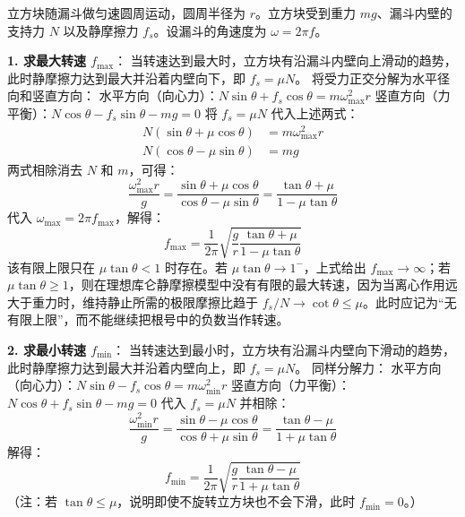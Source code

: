 \begin{solution}
立方块随漏斗做匀速圆周运动，圆周半径为 $r$。立方块受到重力 $mg$、漏斗内壁的支持力 $N$ 以及静摩擦力 $f_s$。设漏斗的角速度为 $\omega = 2\pi f$。

\textbf{1. 求最大转速 $f_{\max}$}：
当转速达到最大时，立方块有沿漏斗内壁向上滑动的趋势，此时静摩擦力达到最大并沿着内壁向下，即 $f_s = \mu N$。
将受力正交分解为水平径向和竖直方向：
水平方向（向心力）：$ N \sin\theta + f_s \cos\theta = m \omega_{\max}^2 r $
竖直方向（力平衡）：$ N \cos\theta - f_s \sin\theta - mg = 0 $
将 $f_s = \mu N$ 代入上述两式：
\begin{align*}
    N(\sin\theta + \mu \cos\theta) &= m \omega_{\max}^2 r \\
    N(\cos\theta - \mu \sin\theta) &= mg
\end{align*}
两式相除消去 $N$ 和 $m$，可得：
$$ \frac{\omega_{\max}^2 r}{g} = \frac{\sin\theta + \mu \cos\theta}{\cos\theta - \mu \sin\theta} = \frac{\tan\theta + \mu}{1 - \mu \tan\theta} $$
代入 $\omega_{\max} = 2\pi f_{\max}$，解得：
$$ f_{\max} = \frac{1}{2\pi} \sqrt{ \frac{g}{r} \frac{\tan\theta + \mu}{1 - \mu \tan\theta} } $$
该有限上限只在 $\mu\tan\theta<1$ 时存在。若 $\mu\tan\theta\to1^{-}$，上式给出 $f_{\max}\to\infty$；若 $\mu\tan\theta\ge1$，则在理想库仑静摩擦模型中没有有限的最大转速，因为当离心作用远大于重力时，维持静止所需的极限摩擦比趋于 $f_s/N\to\cot\theta\le\mu$。此时应记为“无有限上限”，而不能继续把根号中的负数当作转速。

\textbf{2. 求最小转速 $f_{\min}$}：
当转速达到最小时，立方块有沿漏斗内壁向下滑动的趋势，此时静摩擦力达到最大并沿着内壁向上，即 $f_s = \mu N$。
同样分解力：
水平方向（向心力）：$ N \sin\theta - f_s \cos\theta = m \omega_{\min}^2 r $
竖直方向（力平衡）：$ N \cos\theta + f_s \sin\theta - mg = 0 $
代入 $f_s = \mu N$ 并相除：
$$ \frac{\omega_{\min}^2 r}{g} = \frac{\sin\theta - \mu \cos\theta}{\cos\theta + \mu \sin\theta} = \frac{\tan\theta - \mu}{1 + \mu \tan\theta} $$
解得：
$$ f_{\min} = \frac{1}{2\pi} \sqrt{ \frac{g}{r} \frac{\tan\theta - \mu}{1 + \mu \tan\theta} } $$
（注：若 $\tan\theta \le \mu$，说明即使不旋转立方块也不会下滑，此时 $f_{\min} = 0$。）
\end{solution}

